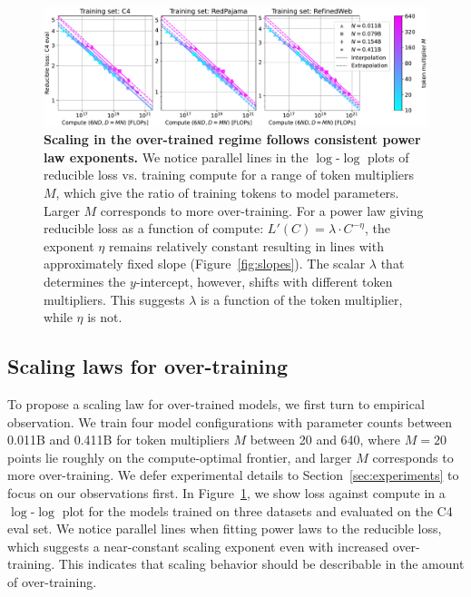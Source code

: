 \begin{figure}[tp]
    \centering
\includegraphics[width=0.98\linewidth]{figs/emperical.pdf}
    \caption{\textbf{Scaling in the over-trained regime follows consistent power law exponents.} We notice parallel lines in the $\log$-$\log$ plots of reducible loss vs. training compute for a range of token multipliers $M$, which give the ratio of training tokens to model parameters. Larger $M$ corresponds to more over-training.
    For a power law giving reducible loss as a function of compute: $L'(C) = \lambda \cdot C^{-\eta}$, the exponent $\eta$ remains relatively constant resulting in lines with approximately fixed slope (Figure~\ref{fig:slopes}).
    The scalar $\lambda$ that determines the $y$-intercept, however, shifts with different token multipliers.
    This suggests $\lambda$ is a function of the token multiplier, while $\eta$ is not.
    }
    \label{fig:emperical}
\end{figure}


\subsection{Scaling laws for over-training}
\label{sec:method_overtraining}

To propose a scaling law for over-trained models, we first turn to empirical observation.
We train four model configurations with parameter counts between 0.011B and 0.411B for token multipliers $M$ between 20 and 640, where $M=20$ points lie roughly on the compute-optimal frontier, and larger $M$ corresponds to more over-training.
We defer experimental details to Section~\ref{sec:experiments} to focus on our observations first.
In Figure~\ref{fig:emperical}, we show loss against compute in a $\log$-$\log$ plot for the models trained on three datasets and evaluated on the C4 eval set. 
We notice parallel lines when fitting power laws to the reducible loss, which suggests a near-constant scaling exponent even with increased over-training. 
This indicates that scaling behavior should be describable in the amount of over-training.

